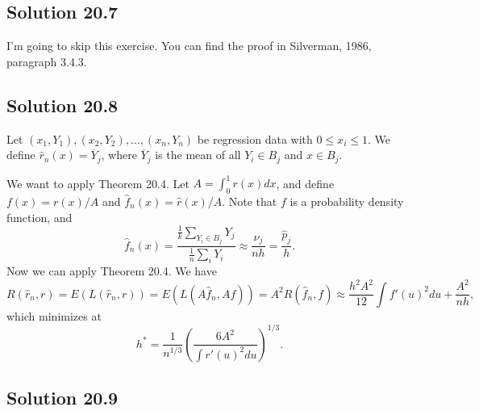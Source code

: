 \subsection*{Solution 20.7}

I'm going to skip this exercise.
You can find the proof in Silverman, 1986, paragraph 3.4.3.


\subsection*{Solution 20.8}

Let $(x_1, Y_1), (x_2, Y_2), ..., (x_n, Y_n)$ be regression data with $0 \leq x_i \leq 1$.
We define $\hat{r}_n(x) = \overline{Y}_j$, where $\overline{Y}_j$ is the mean of all $Y_i \in B_j$ and $x \in B_j$.

We want to apply Theorem 20.4.
Let $A = \int_0^1 r(x) dx$, and define $f(x) = r(x) / A$ and $\hat{f}_n(x) = \hat{r}(x) / A$.
Note that $f$ is a probability density function, and
\begin{equation*}
    \hat{f}_n(x) = \frac{\frac{1}{k} \sum_{Y_i \in B_j} Y_j}{\frac{1}{n} \sum_{i} Y_i}
        \approx \frac{\nu_j}{nh}
        = \frac{\hat{p}_j}{h}.
\end{equation*}
Now we can apply Theorem 20.4.
We have
\begin{equation*}
    R(\hat{r}_n, r) = E(L(\hat{r}_n, r))
        = E(L(A \hat{f}_n, A f))
        = A^2 R(\hat{f}_n, f)
        \approx \frac{h^2 A^2}{12} \int f'(u)^2 du + \frac{A^2}{nh},
\end{equation*}
which minimizes at
\begin{equation*}
    h^* = \frac{1}{n^{1/3}} \left( \frac{6 A^2}{\int r'(u)^2 du} \right)^{1/3}.
\end{equation*}


\subsection*{Solution 20.9}

